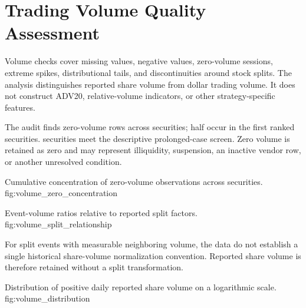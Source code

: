 \section{Trading Volume Quality Assessment}

Volume checks cover missing values, negative values, zero-volume sessions,
extreme spikes, distributional tails, and discontinuities around stock splits.
The analysis distinguishes reported share volume from dollar trading volume.
It does not construct ADV20, relative-volume indicators, or other
strategy-specific features.


The audit finds \ZeroVolumeRows{} zero-volume rows across
\ZeroVolumeSecurities{} securities; half occur in the first
\ZeroHalfSecurities{} ranked securities. \ProlongedZeroCases{} securities meet
the descriptive prolonged-case screen. Zero volume is retained as zero and may
represent illiquidity, suspension, an inactive vendor row, or another
unresolved condition.


  {Cumulative concentration of zero-volume observations across securities.}
  {fig:volume_zero_concentration}

  {Event-volume ratios relative to reported split factors.}
  {fig:volume_split_relationship}

For \SplitVolumeEvents{} split events with measurable neighboring volume, the
data do not establish a single historical share-volume normalization
convention. Reported share volume is therefore retained without a split
transformation.

  {Distribution of positive daily reported share volume on a logarithmic scale.}
  {fig:volume_distribution}

